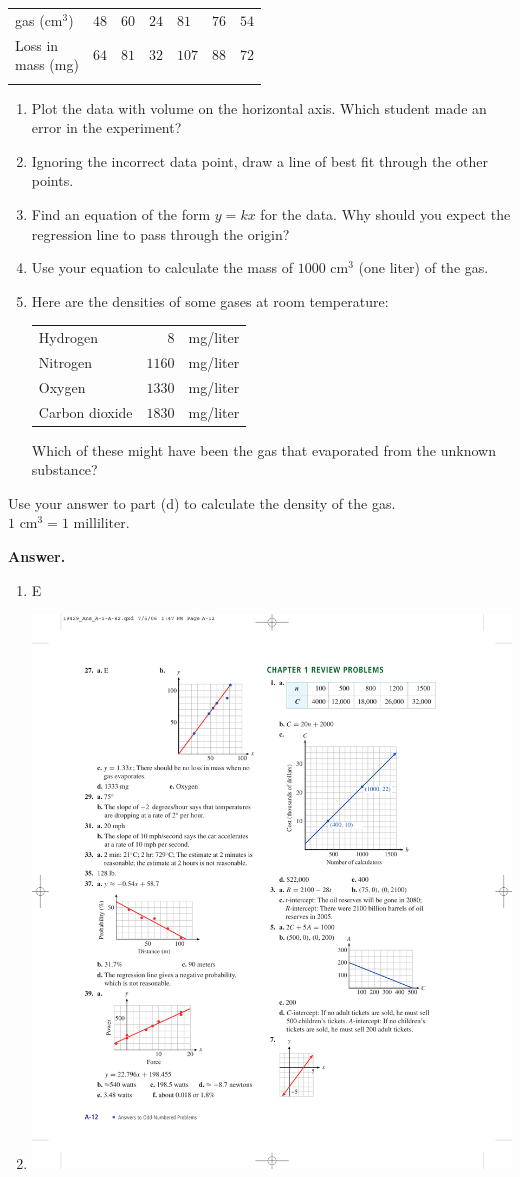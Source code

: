 \documentclass[10pt,]{book}
\makeatletter
\theoremstyle{plain}
\theoremstyle{definition}
\theoremstyle{definition}
\theoremstyle{definition}
\theoremstyle{definition}
\numberwithin{equation}{part}
\newcommand{\hrulethin}  {\noalign{\hrule height 0.04em}}
\newcommand{\tablecelllines}[3]%
{\begin{tabular}[#2]{@{}#1@{}}#3\end{tabular}}
\makeatother
\begin{document}
\begin{exerciselist}
\begin{table}
\begin{tabular}{AlA}
{gas (\(\text{cm}^3\))}
&\(48\)&\(60\)&\(24\)&\(81\)&\(76\)&\(54\)\tabularnewline\hrulethin
\tablecelllines{l}{m}
{Loss in\\
mass (mg)}
&\(64\)&\(81\)&\(32\)&\(107\)&\(88\)&\(72\)\tabularnewline\hrulethin
\end{tabular}
\end{table}
 \leavevmode%
\begin{enumerate}[label=*\alph**]
\item\hypertarget{li-1463}{}Plot the data with volume on the horizontal axis. Which student made an error in the experiment?%
\item\hypertarget{li-1464}{}Ignoring the incorrect data point, draw a line of best fit through the other points.%
\item\hypertarget{li-1465}{}Find an equation of the form \(y = kx\) for the data. Why should you expect the regression line to pass through the origin?%
\item\hypertarget{li-1466}{}Use your equation to calculate the mass of \(1000\text{ cm}^3\) (one liter) of the gas.%
\item\hypertarget{li-1467}{}Here are the densities of some gases at room temperature: \leavevmode%
\begin{table}
\centering
\begin{tabular}{lrl}
Hydrogen&\(8\)&mg/liter\tabularnewline[0pt]
Nitrogen&\(1160\)&mg/liter\tabularnewline[0pt]
Oxygen&\(1330\)&mg/liter\tabularnewline[0pt]
Carbon dioxide&\(1830\)&mg/liter
\end{tabular}
\end{table}
 Which of these might have been the gas that evaporated from the unknown substance?%
\end{enumerate}
%
Use your answer to part (d) to calculate the density of the gas. \(1 \text{ cm}^3 = 1 \text{ milliliter}\).%
\par\smallskip
\par\smallskip
\noindent\textbf{Answer.}\hypertarget{answer-215}{}\quad
\leavevmode%
\begin{multicols}{2}
\begin{enumerate}[label=*\alph**]
\item\hypertarget{li-1468}{}E%
\item\hypertarget{li-1469}{}\includegraphics[width=0.4\linewidth]{images/fig-ans-1-6-27}

\end{enumerate}
\end{multicols}
\end{exerciselist}
\end{document}
